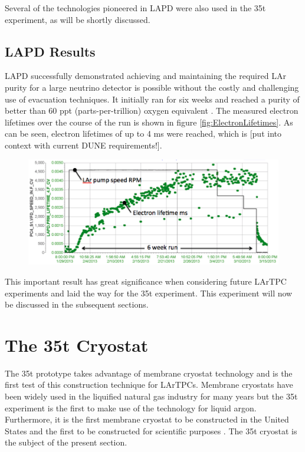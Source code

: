 Several of the technologies pioneered in LAPD were also used in the 35t experiment, as will be shortly discussed.

\subsection{LAPD Results}\label{sec:LAPDResults}

LAPD successfully demonstrated achieving and maintaining the required LAr purity for a large neutrino detector is possible without the costly and challenging use of evacuation techniques.  It initially ran for six weeks and reached a purity of better than 60 ppt (parts-per-trillion) oxygen equivalent \cite{LAPD}.  The measured electron lifetimes over the course of the run is shown in figure \ref{fig:ElectronLifetimes}.  As can be seen, electron lifetimes of up to 4 ms were reached, which is [put into context with current DUNE requirements!].

\begin{figure}[ht]
  \centering
  \includegraphics[width=15cm]{LAPDElectronLifetime.png}
  \caption{}
  \label{fig:LAPDElectronLifetime}
\end{figure}

This important result has great significance when considering future LArTPC experiments and laid the way for the 35t experiment.  This experiment will now be discussed in the subsequent sections.

\section{The 35t Cryostat}\label{sec:35tCryostat}

The 35t prototype takes advantage of membrane cryostat technology and is the first test of this construction technique for LArTPCs.  Membrane cryostats have been widely used in the liquified natural gas industry for many years but the 35t experiment is the first to make use of the technology for liquid argon.  Furthermore, it is the first membrane cryostat to be constructed in the United States and the first to be constructed for scientific purposes \cite{LBNE35tPhaseIOverview}.  The 35t cryostat is the subject of the present section.

